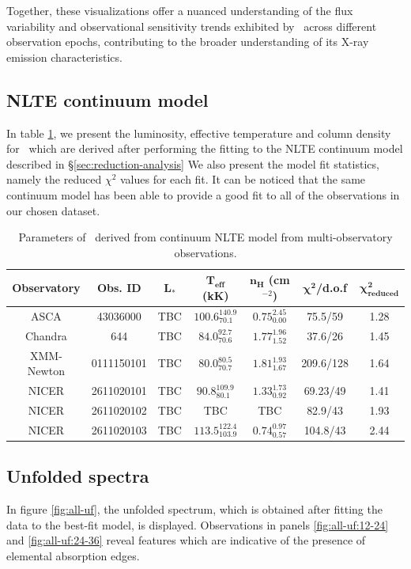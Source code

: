     Together, these visualizations offer a nuanced understanding of the flux variability and observational sensitivity trends exhibited by \source\ across different observation epochs, contributing to the broader understanding of its X-ray emission characteristics.
    
    \subsection{NLTE continuum model}
    In table \ref{tab:res-fitting}, we present the luminosity, effective temperature and column density for \source\ which are derived after performing the fitting to the NLTE continuum model described in \S \ref{sec:reduction-analysis} We also present the model fit statistics, namely the reduced $\chi^2$ values for each fit. It can be noticed that the same continuum model has been able to provide a good fit to all of the observations in our chosen dataset.
    \begin{table}[!htb]
    	\centering
    	\caption{Parameters of \source\ derived from continuum NLTE model from multi-observatory observations.}
    	\label{tab:res-fitting}
    	\begin{tabular}{ccccccc}
			\hline
			{\textbf{Observatory}} & {\textbf{Obs. ID}} & {$\boldsymbol{L_*}$} & {\textbf{$\boldsymbol{T_\text{eff}}$ (kK)}} & {\textbf{$\boldsymbol{n_H}$ (cm$^{-2}$)}} & {$\boldsymbol{\chi^2}$/\textbf{d.o.f}} & {$\boldsymbol{\chi^2_\text{reduced}}$} \\
			\hline
			{ASCA} & {43036000} & {TBC} & {$100.6_{70.1}^{140.9}$} & {$0.75_{0.00}^{2.45}$} & {75.5/59} & {1.28} \\
			{Chandra} & {644} & {TBC} & {$84.0_{70.6}^{92.7}$} & {$1.77_{1.52}^{1.96}$} & {37.6/26} & {1.45} \\
			{XMM-Newton} & {0111150101} & {TBC} & {$80.0_{70.7}^{80.5}$} & {$1.81_{1.67}^{1.93}$} & {209.6/128} & {1.64} \\
			{NICER} & {2611020101} & {TBC} & {$90.8_{80.1}^{109.9}$} & {$1.33_{0.92}^{1.73}$} & {69.23/49} & {1.41} \\
			{NICER} & {2611020102} & {TBC} & {TBC} & {TBC} & {82.9/43} & {1.93} \\
			{NICER} & {2611020103} & {TBC} & {$113.5_{103.9}^{122.4}$} & {$0.74_{0.57}^{0.97}$} & {104.8/43} & {2.44} \\
			\hline
		\end{tabular}
	\end{table}
    
    \subsection{Unfolded spectra}
    In figure \ref{fig:all-uf}, the unfolded spectrum, which is obtained after fitting the data to the best-fit model, is displayed. Observations in panels \ref{fig:all-uf:12-24} and \ref{fig:all-uf:24-36} reveal features which are indicative of the presence of elemental absorption edges.
    
